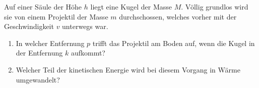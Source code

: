 \begin{Exercise}[label = Kugelschuss, origin = IPHO 1967, difficulty = 2, title = Kugelschuss]
Auf einer Säule der Höhe $h$ liegt eine Kugel der Masse $M$. Völlig grundlos wird sie von einem Projektil der Masse $m$ durchschossen, welches vorher mit der Geschwindigkeit $v$ unterwegs war.
\begin{enumerate}
\item In welcher Entfernung $p$ trifft das Projektil am Boden auf, wenn die Kugel in der Entfernung $k$ aufkommt?
\item Welcher Teil der kinetischen Energie wird bei diesem Vorgang in Wärme umgewandelt?
\end{enumerate} 
\end{Exercise}